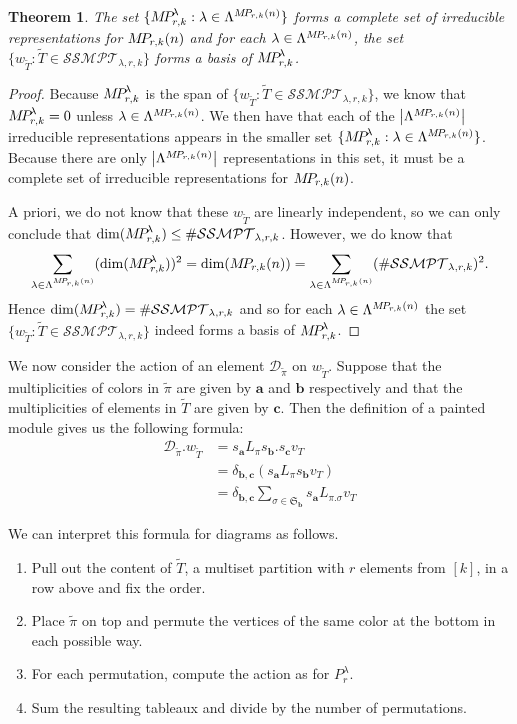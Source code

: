 \documentclass[10pt]{amsart}
\theoremstyle{definition}
\theoremstyle{definition}
\theoremstyle{plain}
\theoremstyle{remark}
\theoremstyle{plain}
\newtheorem{theorem}[theorem]{Theorem}
\theoremstyle{plain}
\newcommand{\DD}{\mathcal{D}}
\newcommand{\SG}{\mathfrak{S}}
\newcommand{\bfa}{{\boldsymbol{a}}}
\newcommand{\bfb}{{\boldsymbol{b}}}
\newcommand{\bfc}{{\boldsymbol{c}}}
\newcommand{\MP}{{\rm M\!P\!}}
\newcommand{\SSMPT}{\mathcal{SSMPT}}
\newcommand{\tpi}{{\tilde{\pi}}}
\newcommand{\tT}{{\tilde{T}}}
\newcommand{\abs}[1]{\left| #1\right |}
\begin{document}
\begin{theorem} The set $\{\MP_{r,k}^\lambda:\lambda\in\Lambda^{\MP_{r,k}(n)}\}$ forms a complete set of irreducible representations for $\MP_{r,k}(n)$ and for each $\lambda\in\Lambda^{\MP_{r,k}(n)}$, the set $\{w_\tT:\tT\in\SSMPT_{\lambda,r,k}\}$ forms a basis of $\MP_{r,k}^\lambda$.
\end{theorem}

\begin{proof} 
    Because $\MP_{r,k}^\lambda$ is the span of $\{w_\tT:\tT\in\SSMPT_{\lambda,r,k}\}$, we know that $\MP_{r,k}^\lambda=0$ unless $\lambda\in\Lambda^{\MP_{r,k}(n)}$. We then have that each of the $\abs{\Lambda^{\MP_{r,k}(n)}}$ irreducible representations appears in the smaller set $\{\MP_{r,k}^\lambda:\lambda\in\Lambda^{\MP_{r,k}(n)}\}$. Because there are only $\abs{\Lambda^{\MP_{r,k}(n)}}$ representations in this set, it must be a complete set of irreducible representations for $\MP_{r,k}(n)$.

    A priori, we do not know that these $w_\tT$ are linearly independent, so we can only conclude that $\dim(\MP_{r,k}^\lambda)\leq\#\SSMPT_{\lambda,r,k}$. However, we do know that
\[\sum_{\lambda\in\Lambda^{\MP_{r,k}(n)}}(\dim(\MP_{r,k}^\lambda))^2=\dim(\MP_{r,k}(n))=\sum_{\lambda\in\Lambda^{\MP_{r,k}(n)}}(\#\SSMPT_{\lambda,r,k})^2.\] Hence $\dim(\MP_{r,k}^\lambda)=\#\SSMPT_{\lambda,r,k}$ and so for each $\lambda\in\Lambda^{\MP_{r,k}(n)}$ the set $\{w_\tT:\tT\in\SSMPT_{\lambda,r,k}\}$ indeed forms a basis of $\MP_{r,k}^\lambda$.
\end{proof}

We now consider the action of an element $\DD_\tpi$ on $w_\tT$. Suppose that the multiplicities of colors in $\tpi$ are given by $\bfa$ and $\bfb$ respectively and that the multiplicities of elements in $\tT$ are given by $\bfc$. Then the definition of a painted module gives us the following formula: \begin{align*}
    \DD_\tpi.w_\tT&=s_\bfa L_\pi s_\bfb . s_\bfc v_T\\
                  &=\delta_{\bfb,\bfc}(s_\bfa L_\pi s_\bfb v_T)\\
                  &=\delta_{\bfb,\bfc}\sum_{\sigma\in\SG_\bfb}s_\bfa L_{\pi.\sigma} v_T
\end{align*}

We can interpret this formula for diagrams as follows.
\begin{enumerate}
    \item[(i)] Pull out the content of $\tT$, a multiset partition with $r$ elements from $[k]$, in a row above and fix the order.
    \item[(ii)] Place $\tpi$ on top and permute the vertices of the same color at the bottom in each possible way.
    \item[(iii)] For each permutation, compute the action as for $P_r^\lambda$.
    \item[(iv)] Sum the resulting tableaux and divide by the number of permutations.
\end{enumerate}
\end{document}
